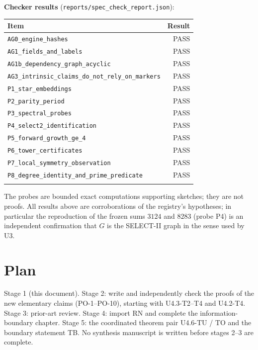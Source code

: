 \documentclass[11pt]{article}
\begin{document}
\textbf{Checker results} (\texttt{reports/spec\_check\_report.json}): \begin{center}\begin{tabular}{@{}lr@{}}\toprule Item & Result\\\midrule
\texttt{AG0\_engine\_hashes} & PASS\\
\texttt{AG1\_fields\_and\_labels} & PASS\\
\texttt{AG1b\_dependency\_graph\_acyclic} & PASS\\
\texttt{AG3\_intrinsic\_claims\_do\_not\_rely\_on\_markers} & PASS\\
\texttt{P1\_star\_embeddings} & PASS\\
\texttt{P2\_parity\_period} & PASS\\
\texttt{P3\_spectral\_probes} & PASS\\
\texttt{P4\_select2\_identification} & PASS\\
\texttt{P5\_forward\_growth\_ge\_4} & PASS\\
\texttt{P6\_tower\_certificates} & PASS\\
\texttt{P7\_local\_symmetry\_observation} & PASS\\
\texttt{P8\_degree\_identity\_and\_prime\_predicate} & PASS\\
\\\bottomrule\end{tabular}\end{center}
The probes are bounded exact computations supporting sketches; they are not proofs. All results above are corroborations of the registry's hypotheses; in particular the reproduction of the frozen sums $3124$ and $8283$ (probe P4) is an independent confirmation that $G$ is the SELECT-II graph in the sense used by U3.

\section{Plan}
Stage 1 (this document). Stage 2: write and independently check the proofs of the new elementary claims (PO-1--PO-10), starting with U4.3-T2--T4 and U4.2-T4. Stage 3: prior-art review. Stage 4: import RN and complete the information-boundary chapter. Stage 5: the coordinated theorem pair U4.6-TU / TO and the boundary statement TB. No synthesis manuscript is written before stages 2--3 are complete.
\end{document}
